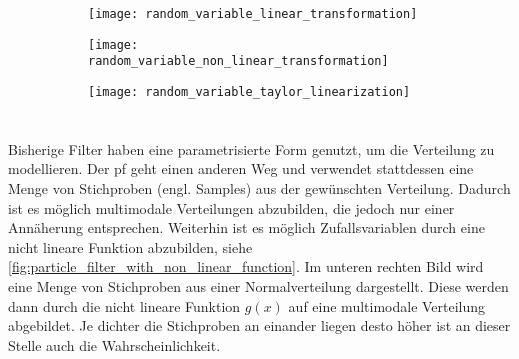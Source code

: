 \begin{figure}
	\centering
	\begin{subfigure}{0.49\linewidth}
		\centering
		\texttt{[image: random\_variable\_linear\_transformation]}
		\caption{}
		\label{fig:random_variable_linear_transformation}
	\end{subfigure}
	\hfill
	\begin{subfigure}{0.49\linewidth}
		\centering
		\texttt{[image: random\_variable\_non\_linear\_transformation]}
		\caption{}
		\label{fig:random_variable_non_linear_transformation}
	\end{subfigure}
	\par
	\bigskip
	\begin{subfigure}{0.49\linewidth}
		\centering
		\texttt{[image: random\_variable\_taylor\_linearization]}
		\caption{}
		\label{fig:random_variable_taylor_linearization}
	\end{subfigure}
	\label{fig:random_variable_transformation}
\end{figure}


%
%
\section{}
\label{sec:particle_filter}

Bisherige Filter haben eine parametrisierte Form genutzt, um die Verteilung zu modellieren. Der \Gls{pf} geht einen anderen Weg und verwendet stattdessen eine Menge von Stichproben (engl. Samples) aus der gewünschten Verteilung. Dadurch ist es möglich multimodale Verteilungen abzubilden, die jedoch nur einer Annäherung entsprechen. Weiterhin ist es möglich Zufallsvariablen durch eine nicht lineare Funktion abzubilden, siehe \autoref {fig:particle_filter_with_non_linear_function}. Im unteren rechten Bild wird eine Menge von Stichproben aus einer Normalverteilung dargestellt. Diese werden dann durch die nicht lineare Funktion $g(x)$ auf eine multimodale Verteilung abgebildet. Je dichter die Stichproben an einander liegen desto höher ist an dieser Stelle auch die Wahrscheinlichkeit.

